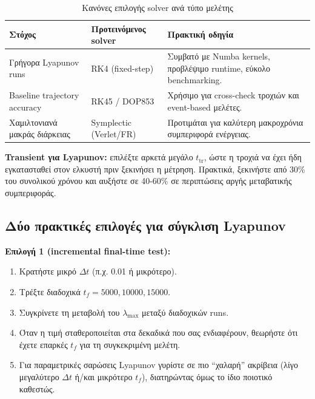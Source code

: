 \documentclass[11pt,a4paper]{report}
\begin{document}
\begin{table}[H]
\centering
\caption{Κανόνες επιλογής solver ανά τύπο μελέτης}
\label{tab:ch2-solver-choice}
\renewcommand{\arraystretch}{1.15}
\begin{tabular}{|p{}|p{}|p{}|}
\hline
\textbf{Στόχος} & \textbf{Προτεινόμενος solver} & \textbf{Πρακτική οδηγία} \\
\hline
Γρήγορα Lyapunov runs & RK4 (fixed-step) & Συμβατό με Numba kernels, προβλέψιμο runtime, εύκολο benchmarking. \\
\hline
Baseline trajectory accuracy & RK45 / DOP853 & Χρήσιμο για cross-check τροχιών και event-based μελέτες. \\
\hline
Χαμιλτονιανά μακράς διάρκειας & Symplectic (Verlet/FR) & Προτιμάται για καλύτερη μακροχρόνια συμπεριφορά ενέργειας. \\
\hline
\end{tabular}
\end{table}

\begin{importantbox}
\textbf{Transient για Lyapunov:} επιλέξτε αρκετά μεγάλο $t_{\mathrm{tr}}$, ώστε η τροχιά να έχει ήδη εγκατασταθεί στον ελκυστή πριν ξεκινήσει η μέτρηση. Πρακτικά, ξεκινήστε από 30\% του συνολικού χρόνου και αυξήστε σε 40-60\% σε περιπτώσεις αργής μεταβατικής συμπεριφοράς.
\end{importantbox}

\subsection{Δύο πρακτικές επιλογές για σύγκλιση Lyapunov}

\begin{guidebox}
\textbf{Επιλογή 1 (incremental final-time test):}
\begin{enumerate}
\item Κρατήστε μικρό $\Delta t$ (π.χ. 0.01 ή μικρότερο).
\item Τρέξτε διαδοχικά $t_f = 5000, 10000, 15000$.
\item Συγκρίνετε τη μεταβολή του $\lambda_{\max}$ μεταξύ διαδοχικών runs.
\item Όταν η τιμή σταθεροποιείται στα δεκαδικά που σας ενδιαφέρουν, θεωρήστε ότι έχετε επαρκές $t_f$ για τη συγκεκριμένη μελέτη.
\item Για παραμετρικές σαρώσεις Lyapunov γυρίστε σε πιο ``χαλαρή'' ακρίβεια (λίγο μεγαλύτερο $\Delta t$ ή/και μικρότερο $t_f$), διατηρώντας όμως το ίδιο ποιοτικό καθεστώς.
\end{enumerate}
\end{guidebox}
\end{document}
